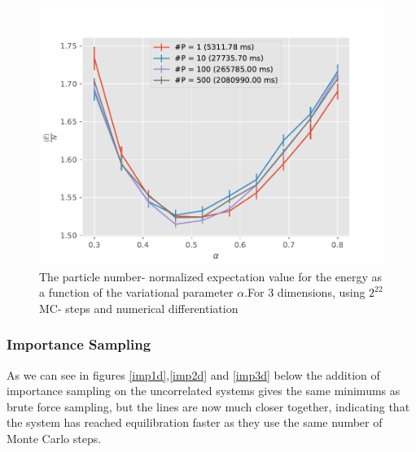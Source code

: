 \documentclass[11pt,a4paper,titlepage]{article}
\begin{document}
\begin{figure}[H]
\centering

\includegraphics[trim=0cm 0.0cm 0cm 1.0cm, clip=true,scale = 0.7]{HarmonicOscillator_SimpleGaussianNumerical_D3_2pow22_numerical_NoTitle.pdf}
\caption[Numerical No interaction (3D)]{The particle number- normalized expectation value for the energy as a function of the variational parameter $\alpha$.For 3 dimensions, using $2^{22}$ MC- steps and numerical differentiation}\label{3dNumeric}
\end{figure}




\subsubsection{Importance  Sampling}
As we can see in figures \ref{imp1d},\ref{imp2d} and \ref{imp3d} below the addition of importance sampling on the uncorrelated systems gives the same minimums as brute force sampling, but the lines are now much closer together, indicating that the system has reached equilibration faster as they use the same number of Monte Carlo steps.
\end{document}
